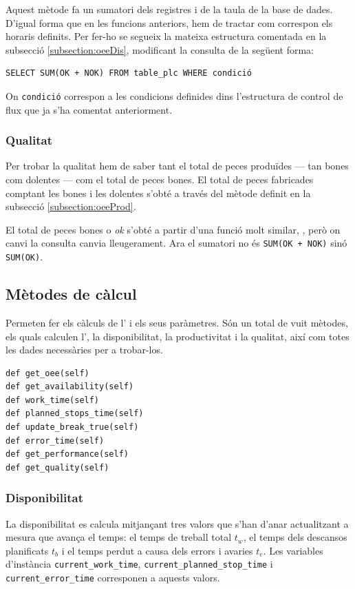 \documentclass{tfgitic}[2022/06/30]
\begin{document}
Aquest mètode fa un sumatori dels registres  i  de la taula  de la base de dades. D'igual forma que en les funcions anteriors, hem de tractar com correspon els horaris definits. Per fer-ho se segueix la mateixa estructura comentada en la subsecció \ref{subsection:oeeDis}, modificant la consulta de la següent forma:

\begin{lstlisting}[style = sql]
SELECT SUM(OK + NOK) FROM table_plc WHERE condició
\end{lstlisting}

On \texttt{condició} correspon a les condicions definides dins l'estructura de control de flux que ja s'ha comentat anteriorment.

\subsubsection{Qualitat}
Per trobar la qualitat hem de saber tant el total de peces produïdes --- tan bones com dolentes --- com el total de peces bones. El total de peces fabricades comptant les bones i les dolentes s'obté a través del mètode  definit en la subsecció \ref{subsection:oeeProd}.

El total de peces bones o \emph{ok} s'obté a partir d'una funció molt similar, , però on canvi la consulta canvia lleugerament. Ara el sumatori no és \texttt{SUM(OK + NOK)} sinó \texttt{SUM(OK)}.

\subsection{Mètodes de càlcul}
Permeten fer els càlculs de l' i els seus paràmetres. Són un total de vuit mètodes, els quals calculen l', la disponibilitat, la productivitat i la qualitat, així com totes les dades necessàries per a trobar-los. 

\begin{lstlisting}[style = Python]
def get_oee(self)
def get_availability(self)
def work_time(self)
def planned_stops_time(self)
def update_break_true(self)
def error_time(self)
def get_performance(self)
def get_quality(self)
\end{lstlisting}

\subsubsection{Disponibilitat}
La disponibilitat es calcula mitjançant tres valors que s'han d'anar actualitzant a mesura que avança el temps: el temps de treball total $t_{w}$, el temps dels descansos planificats $t_{b}$ i el temps perdut a causa dels errors i avaries $t_{e}$. Les variables d'instància \texttt{current\_work\_time}, \texttt{current\_planned\_stop\_time} i \texttt{current\_error\_time} corresponen a aquests valors.
\end{document}
